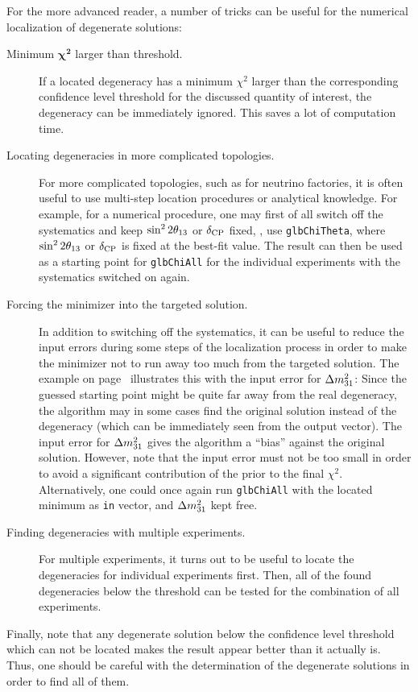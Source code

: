 For the more advanced reader, a number of tricks can be useful for the numerical localization of degenerate solutions:
\begin{description}
\item[Minimum $\boldsymbol{\chi^2}$ larger than threshold.] If a located degeneracy has a minimum $\chi^2$ larger than the corresponding confidence level threshold for the discussed quantity of interest, the degeneracy can be immediately ignored. This saves a lot of computation time.
\item[Locating degeneracies in more complicated topologies.] For more complicated topologies, such as for neutrino factories, it is often useful to use multi-step location procedures or analytical knowledge. For example, for a numerical procedure, one may first of all switch off the systematics and keep $\sin^2 2 \theta_{13}$ or $\delta_{\mathrm{CP}}$ fixed, \ie, use {\tt glbChiTheta}, where $\sin^2 2 \theta_{13}$ or $\delta_{\mathrm{CP}}$ is fixed at the best-fit value. The result can then be used as a starting point for {\tt glbChiAll} for the individual experiments with the systematics switched on again. 
\item[Forcing the minimizer into the targeted solution.]
In addition to switching off the systematics, it can be useful to reduce the input errors during some steps of the localization process in order to make the minimizer not to run away too much from the targeted solution.
The example on page~\pageref{ex:sgndeg} illustrates this with the
input error for $\Delta m_{31}^2$: Since the guessed starting point might be
quite far away from the real degeneracy, the algorithm may in some cases
find the original solution instead of the degeneracy (which can
be immediately seen from the output vector). The input error
for $\Delta m_{31}^2$ gives the algorithm a ``bias'' against the original solution.
However, note that the input error must not be too small in order
to avoid a significant contribution of the prior to the final $\chi^2$.
Alternatively, one could once again run {\tt glbChiAll} with the located 
minimum as {\tt in} vector, and $\Delta m_{31}^2$ kept free.
\item[Finding degeneracies with multiple experiments.] For multiple experiments, it turns out to be useful to locate the degeneracies for individual experiments first. Then, all of the found degeneracies below the threshold can be tested for the combination of all experiments.
\end{description}
Finally, note that any degenerate solution below the confidence level threshold which can not be located makes the result appear better than it actually is. Thus, one should be careful with the determination of the degenerate solutions in order to find all of them.


